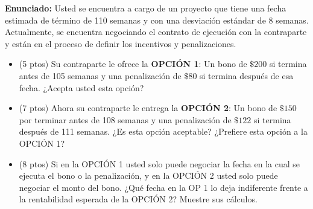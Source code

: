 \documentclass[11pt, a4paper]{article}
\begin{document}
  \textbf{Enunciado:}
  Usted se encuentra a cargo de un proyecto que tiene una fecha estimada de término de 110 semanas y con una desviación estándar de 8 semanas. Actualmente, se encuentra negociando el contrato de ejecución con la contraparte y están en el proceso de definir los incentivos y penalizaciones.
  \begin{itemize}
    \item[\textbf{i.}] (5 ptos) Su contraparte le ofrece la \textbf{OPCIÓN 1}: Un bono de $\$200$ si termina antes de 105 semanas y una penalización de $\$80$ si termina después de esa fecha. ¿Acepta usted esta opción?
    \item[\textbf{ii.}] (7 ptos) Ahora su contraparte le entrega la \textbf{OPCIÓN 2}: Un bono de $\$150$ por terminar antes de 108 semanas y una penalización de $\$122$ si termina después de 111 semanas. ¿Es esta opción aceptable? ¿Prefiere esta opción a la OPCIÓN 1?
    \item[\textbf{iii.}] (8 ptos) Si en la OPCIÓN 1 usted solo puede negociar la fecha en la cual se ejecuta el bono o la penalización, y en la OPCIÓN 2 usted solo puede negociar el monto del bono. ¿Qué fecha en la OP 1 lo deja indiferente frente a la rentabilidad esperada de la OPCIÓN 2? Muestre sus cálculos.
  \end{itemize}
\end{document}
